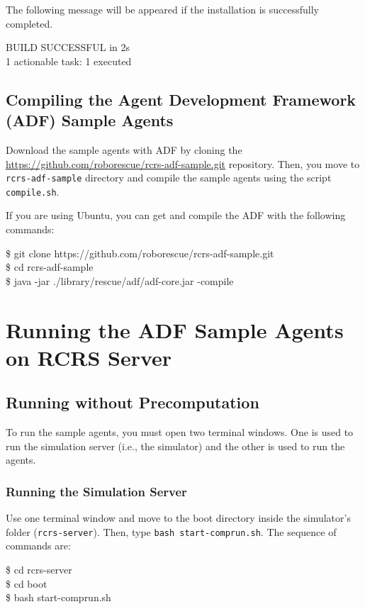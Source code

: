 \documentclass{article}
\begin{document}
The following message will be appeared if the installation is successfully completed.

\begin{center}
  \begin{tcolorbox}[title=Install Completion, width=.98\linewidth]
  {\ttfamily
  BUILD SUCCESSFUL in 2s\\
  1 actionable task: 1 executed
  }
  \end{tcolorbox}
\end{center}
\subsection{Compiling the Agent Development Framework (ADF) Sample Agents}
Download the sample agents with ADF by cloning the \url{https://github.com/roborescue/rcrs-adf-sample.git} repository. Then, you move to \texttt{rcrs-adf-sample} directory and compile the sample agents using the
script \texttt{compile.sh}.

If you are using Ubuntu, you can get and compile the ADF with the following commands:

\begin{center}
  \begin{tcolorbox}[title=Download ADF on Ubuntu, width=.98\linewidth]
  {\ttfamily\small
  \$ git clone https://github.com/roborescue/rcrs-adf-sample.git\\
   \$ cd rcrs-adf-sample\\
   \$ java -jar ./library/rescue/adf/adf-core.jar -compile
  }
  \end{tcolorbox}
\end{center}
\section{Running the ADF Sample Agents on RCRS Server}
\subsection{Running without Precomputation}
To run the sample agents, you must open two terminal windows. One is used to run the simulation server (i.e., the simulator) and the other is used to run the agents.
\subsubsection{Running the Simulation Server}
Use one terminal window and move to the boot directory inside the simulator's folder (\texttt{rcrs-server}). Then, type \texttt{bash start-comprun.sh}. The sequence of commands are:
\begin{center}
   \begin{tcolorbox}[title=Running Simulation Server, width=.98\linewidth]
    {\ttfamily
    \$ cd rcrs-server\\
    \$ cd boot\\
    \$ bash start-comprun.sh
    }
  \end{tcolorbox}
\end{center}
\end{document}
